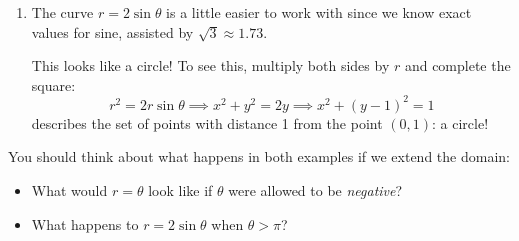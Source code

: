 \begin{examples}{}{}
\begin{enumerate}
	  \item The curve $r=2\sin\theta$ is a little easier to work with since we know exact values for sine, assisted by $\sqrt 3\approx 1.73$.\par
		This looks like a circle! To see this, multiply both sides by $r$ and complete the square:
		\[
			r^2=2r\sin\theta
			\implies x^2+y^2=2y 
			\implies x^2+(y-1)^2=1
		\]
		describes the set of points with distance 1 from the point $(0,1)$: a circle!
	\end{enumerate}
\end{examples}

You should think about what happens in both examples if we extend the domain:
\begin{itemize}
  \item What would $r=\theta$ look like if $\theta$ were allowed to be \emph{negative}?
  \item What happens to $r=2\sin\theta$ when $\theta>\pi$? 
\end{itemize}


\clearpage


